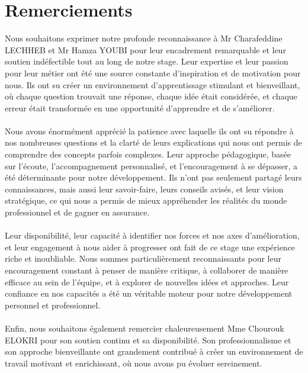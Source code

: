 \documentclass[a4paper, oneside, 12pt, final]{extreport}
\begin{document}
\chapter*{Remerciements}
\thispagestyle{empty}
%
Nous souhaitons exprimer notre profonde reconnaissance à Mr Charafeddine LECHHEB et Mr Hamza YOUBI pour leur encadrement remarquable et leur soutien indéfectible tout au long de notre stage. Leur expertise et leur passion pour leur métier ont été une source constante d'inspiration et de motivation pour nous. Ils ont su créer un environnement d'apprentissage stimulant et bienveillant, où chaque question trouvait une réponse, chaque idée était considérée, et chaque erreur était transformée en une opportunité d'apprendre et de s'améliorer.
\\
\\
Nous avons énormément apprécié la patience avec laquelle ils ont su répondre à nos nombreuses questions et la clarté de leurs explications qui nous ont permis de comprendre des concepts parfois complexes. Leur approche pédagogique, basée sur l'écoute, l'accompagnement personnalisé, et l'encouragement à se dépasser, a été déterminante pour notre développement. Ils n'ont pas seulement partagé leurs connaissances, mais aussi leur savoir-faire, leurs conseils avisés, et leur vision stratégique, ce qui nous a permis de mieux appréhender les réalités du monde professionnel et de gagner en assurance.
\\
\\
Leur disponibilité, leur capacité à identifier nos forces et nos axes d'amélioration, et leur engagement à nous aider à progresser ont fait de ce stage une expérience riche et inoubliable. Nous sommes particulièrement reconnaissants pour leur encouragement constant à penser de manière critique, à collaborer de manière efficace au sein de l'équipe, et à explorer de nouvelles idées et approches. Leur confiance en nos capacités a été un véritable moteur pour notre développement personnel et professionnel.
\\
\\
Enfin, nous souhaitons également remercier chaleureusement Mme Chourouk ELOKRI pour son soutien continu et sa disponibilité. Son professionnalisme et son approche bienveillante ont grandement contribué à créer un environnement de travail motivant et enrichissant, où nous avons pu évoluer sereinement.
\end{document}
